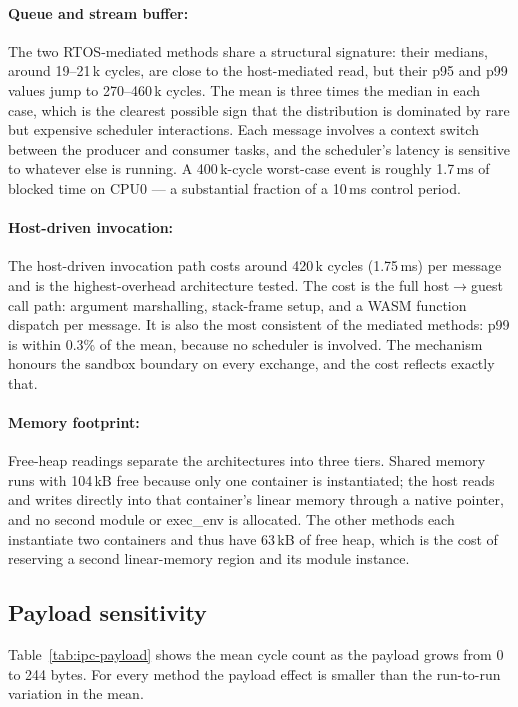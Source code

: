 \documentclass[12pt, a4paper]{report}
\begin{document}
\paragraph{Queue and stream buffer:} The two RTOS-mediated methods share a structural signature: their medians, around 19--21\,k cycles, are close to the host-mediated read, but their p95 and p99 values jump to 270--460\,k cycles. The mean is three times the median in each case, which is the clearest possible sign that the distribution is dominated by rare but expensive scheduler interactions. Each message involves a context switch between the producer and consumer tasks, and the scheduler's latency is sensitive to whatever else is running. A 400\,k-cycle worst-case event is roughly 1.7\,ms of blocked time on CPU0 --- a substantial fraction of a 10\,ms control period.

\paragraph{Host-driven invocation:} The host-driven invocation path costs around 420\,k cycles (1.75\,ms) per message and is the highest-overhead architecture tested. The cost is the full host$\to$guest call path: argument marshalling, stack-frame setup, and a WASM function dispatch per message. It is also the most consistent of the mediated methods: p99 is within 0.3\% of the mean, because no scheduler is involved. The mechanism honours the sandbox boundary on every exchange, and the cost reflects exactly that.

\paragraph{Memory footprint:} Free-heap readings separate the architectures into three tiers. Shared memory runs with 104\,kB free because only one container is instantiated; the host reads and writes directly into that container's linear memory through a native pointer, and no second module or exec\_env is allocated. The other methods each instantiate two containers and thus have 63\,kB of free heap, which is the cost of reserving a second linear-memory region and its module instance.

\subsection{Payload sensitivity}
\label{subsec:containerization-payload}

Table~\ref{tab:ipc-payload} shows the mean cycle count as the payload grows from 0 to 244 bytes. For every method the payload effect is smaller than the run-to-run variation in the mean.
\end{document}
